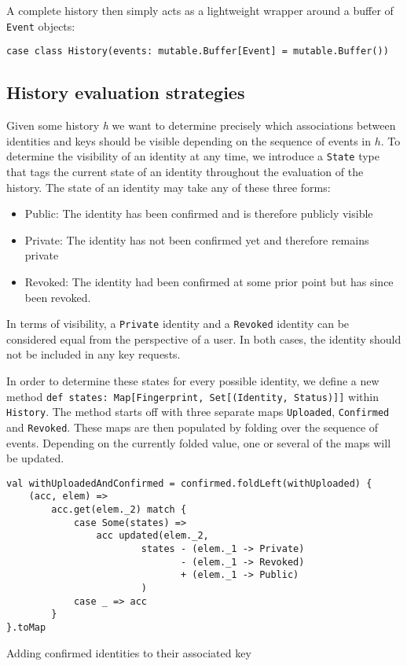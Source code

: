 A complete history then simply acts as a lightweight wrapper around a buffer of \texttt{Event} objects:
\begin{verbatim}
case class History(events: mutable.Buffer[Event] = mutable.Buffer())
\end{verbatim}

\subsection{History evaluation strategies}
Given some history \emph{h} we want to determine precisely which associations between identities and keys should be visible depending on the sequence of events in \(h\).
To determine the visibility of an identity at any time, we introduce a \texttt{State} type that tags the current state of an identity throughout the evaluation of the history.
The state of an identity may take any of these three forms: 
\begin{itemize}
    \item Public: The identity has been confirmed and is therefore publicly visible
    \item Private: The identity has not been confirmed yet and therefore remains private
    \item Revoked: The identity had been confirmed at some prior point but has since been revoked.
\end{itemize}
In terms of visibility, a \texttt{Private} identity and a \texttt{Revoked} identity can be considered equal from the perspective of a user. In both cases, the identity should not be included in any key requests.

In order to determine these states for every possible identity, we define a new method \texttt{def states: Map[Fingerprint, Set[(Identity, Status)]]} within \texttt{History}.
The method starts off with three separate maps \texttt{Uploaded}, \texttt{Confirmed} and \texttt{Revoked}. These maps are then populated by folding over the sequence of events.
Depending on the currently folded value, one or several of the maps will be updated. 

\begin{code}
    \begin{verbatim}
val withUploadedAndConfirmed = confirmed.foldLeft(withUploaded) { 
    (acc, elem) =>
        acc.get(elem._2) match {
            case Some(states) =>
                acc updated(elem._2, 
                        states - (elem._1 -> Private) 
                               - (elem._1 -> Revoked) 
                               + (elem._1 -> Public)
                        )
            case _ => acc
        }
}.toMap
    \end{verbatim}
    \caption{Adding confirmed identities to their associated key}
\end{code}

